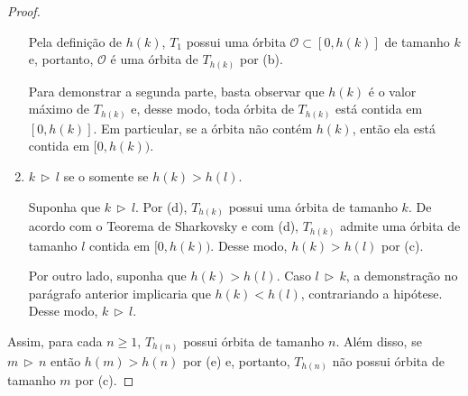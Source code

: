 \begin{proof}
\begin{enumerate}[label = (\alph*)]
Pela definição de $h(k)$, $T_1$ possui uma órbita $\mathcal{O} \subset [0, h(k)]$ de tamanho $k$ e, portanto, $\mathcal{O}$ é uma órbita de $T_{h(k)}$ por (b).

Para demonstrar a segunda parte, basta observar que $h(k)$ é o valor máximo de $T_{h(k)}$ e, desse modo, toda órbita de $T_{h(k)}$ está contida em $[0, h(k)]$. Em particular, se a órbita não contém $h(k)$, então ela está contida em $[0, h(k))$.

\item $k \,\triangleright\, l$ se o somente se $h(k) > h(l)$.

Suponha que $k \,\triangleright\, l$. Por (d), $T_{h(k)}$ possui uma órbita de tamanho $k$. De acordo com o Teorema de Sharkovsky e com (d), $T_{h(k)}$ admite uma órbita de tamanho $l$ contida em $[0, h(k))$. Desse modo,  $h(k) > h(l)$ por (c).

Por outro lado, suponha que $h(k) > h(l)$. Caso $l \,\triangleright\, k$, a demonstração no parágrafo anterior implicaria que $h(k) < h(l)$, contrariando a hipótese. Desse modo, $k \,\triangleright\, l$.
\end{enumerate}

Assim, para cada $n \geq 1$, $T_{h(n)}$ possui órbita de tamanho $n$. Além disso, se $m \,\triangleright\, n$ então $h(m) > h(n)$ por (e) e, portanto, $T_{h(n)}$ não possui órbita de tamanho $m$ por (c).
\end{proof}
